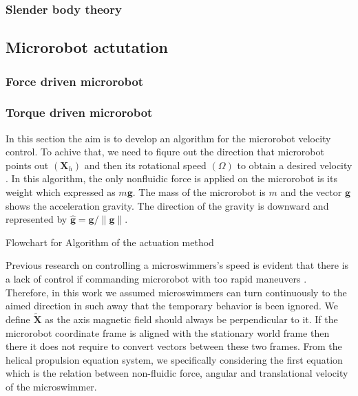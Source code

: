 \documentclass[12pt,a4paper,titlepage]{report}
\begin{document}
\subsubsection{Slender body theory}\label{method1}


\subsection{Microrobot actutation}\label{microActuation}



\subsubsection{Force driven microrobot}

\subsubsection{Torque driven microrobot}

In this section the aim is to develop an algorithm for the microrobot velocity control. To achive that, we need to 
fiqure out the direction that microrobot points out $(\bm{X}_{h})$ and then its rotational speed $(\Omega)$
 to obtain a desired velocity \cite{mahoney2011velocity}.
In this algorithm, the only nonfluidic force is applied on the microrobot is its weight which expressed as 
$m\bm{g}$. The mass of the microrobot is $m$ and the vector $\bm{g}$ shows the acceleration gravity. 
The direction of the gravity is downward and represented by $\hat{ \bm{g} }= \bm{g}/ \| \bm{g}\|$.






Flowchart for Algorithm of the actuation method


Previous research on controlling a microswimmers\rq{}s speed is evident that there is a lack
of control if commanding microrobot with too rapid maneuvers \citep{zhang2009characterizing} \citep{zhang2009artificial}
. Therefore, in this work we assumed
microswimmers can turn continuously to the aimed direction in such away that the temporary behavior is been
ignored. We define $\tilde{\bm{X}}$ as the axis magnetic field should always be perpendicular to it.
If the microrobot coordinate frame is aligned with the stationary world frame then there it does not require
to convert vectors between these two frames. From the helical propulsion equation system, 
we specifically considering the first equation which is the relation between non-fluidic force, angular and 
translational velocity of the microswimmer. 
\end{document}
